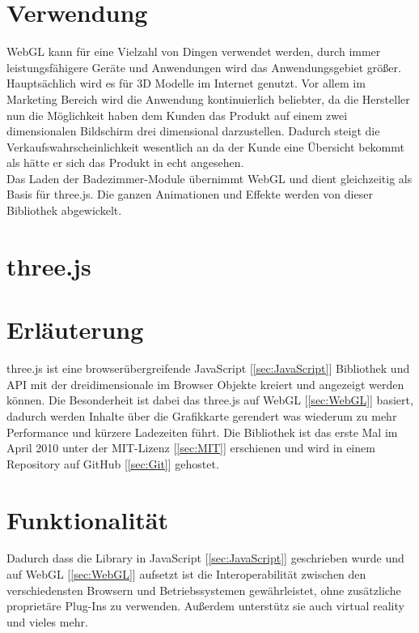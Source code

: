 \section*{Verwendung}
WebGL kann für eine Vielzahl von Dingen verwendet werden, durch immer leistungsfähigere Geräte und Anwendungen wird das Anwendungsgebiet größer. Hauptsächlich wird es für 3D Modelle im Internet genutzt. Vor allem im Marketing Bereich wird die Anwendung kontinuierlich beliebter, da die Hersteller nun die Möglichkeit haben dem Kunden das Produkt auf einem zwei dimensionalen Bildschirm drei dimensional darzustellen. Dadurch steigt die Verkaufswahrscheinlichkeit wesentlich an da der Kunde eine Übersicht bekommt als hätte er sich das Produkt in echt angesehen.
\\
Das Laden der Badezimmer-Module übernimmt WebGL und dient gleichzeitig als Basis für three.js. Die ganzen Animationen und Effekte werden von dieser Bibliothek abgewickelt.



\newpage
\clearpage


\section{three.js}
\cite{Three.js_GitHub} \cite{Three.js}
\section*{Erläuterung}
three.js ist eine browserübergreifende JavaScript [\ref{sec:JavaScript}]  Bibliothek und API mit der dreidimensionale im Browser Objekte kreiert und angezeigt werden können. Die Besonderheit ist dabei das three.js auf WebGL [\ref{sec:WebGL}] basiert, dadurch werden Inhalte über die Grafikkarte gerendert was wiederum zu mehr Performance und kürzere Ladezeiten führt. Die Bibliothek ist das erste Mal im April 2010 unter der MIT-Lizenz [\ref{sec:MIT}] erschienen und wird in einem Repository auf GitHub [\ref{sec:Git}] gehostet.

\section*{Funktionalität}
Dadurch dass die Library in JavaScript [\ref{sec:JavaScript}]   geschrieben wurde und auf WebGL [\ref{sec:WebGL}] aufsetzt ist die Interoperabilität zwischen den verschiedensten Browsern und Betriebssystemen gewährleistet, ohne zusätzliche proprietäre Plug-Ins zu verwenden. Außerdem unterstütz sie auch virtual reality und vieles mehr.

